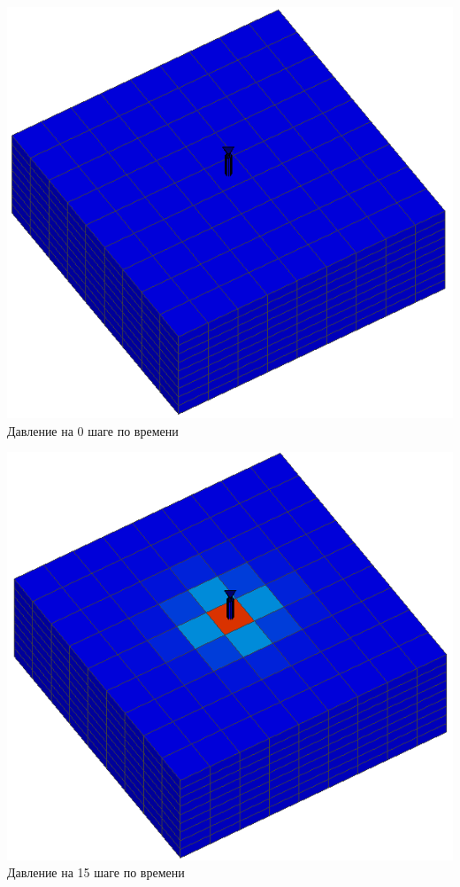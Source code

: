 \documentclass[12pt,a4paper]{article}
\begin{document}
{{  \\
\begin{minipage}[h]{0.4\linewidth}
{\center\includegraphics[width=1\linewidth]{pics/pressure999_0.png}} Давление на 0 шаге по времени \\
\end{minipage}
\hfill
\begin{minipage}[h]{0.4\linewidth}
{\center\includegraphics[width=1\linewidth]{pics/pressure999_15.png}} \\Давление на 15 шаге по времени

\end{minipage}}}
\end{document}
